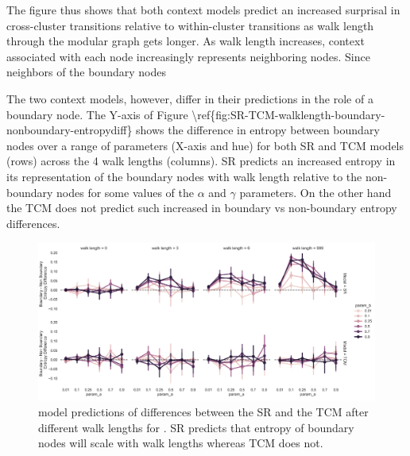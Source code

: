 The figure thus shows that both context models predict an increased surprisal \ac{in cross-cluster transitions relative to within-cluster transitions} as walk length through the modular graph gets longer. As walk length increases, context associated with each node increasingly represents neighboring nodes. Since neighbors of the boundary nodes 

The two context models, however, differ in their predictions in the role of a boundary node. \ac{The Y-axis of Figure \ref{fig:SR-TCM-walklength-boundary-nonboundary-entropydiff} shows the difference in entropy between boundary nodes over a range of parameters (X-axis and hue) for both SR and TCM models (rows) across the 4 walk lengths (columns).} SR predicts an increased entropy in its representation of the boundary nodes with walk length relative to the non-boundary nodes for some values of the $\alpha$ and $\gamma$ parameters. On the other hand the TCM does not predict such increased in boundary vs non-boundary entropy differences. 

\begin{figure}[ht]
	\centering
	\includegraphics[width = \textwidth]{chapter_notebooks/chapter_2/figures/SR_TCM_walklength_boundary_nonboundary_entropydiff.png}
	\caption{ model predictions of differences between the SR and the TCM after different walk lengths for . SR predicts that entropy of boundary nodes will scale with walk lengths whereas TCM does not.}
	\label{fig:SR-TCM-walklength-boundary-nonboundary-entropydiff}
\end{figure}


